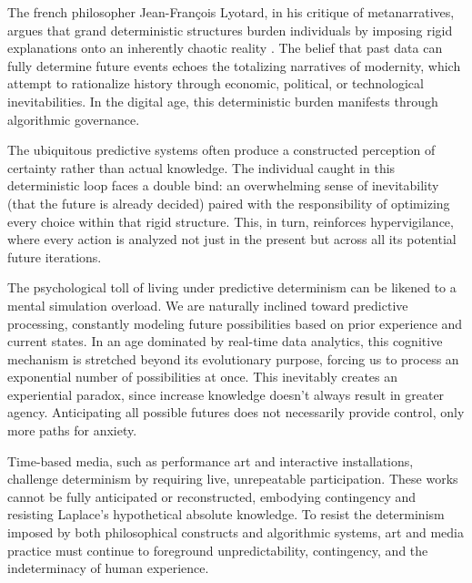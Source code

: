 The french philosopher Jean-François Lyotard, in his critique of metanarratives, argues that grand deterministic structures burden individuals by imposing rigid explanations onto an inherently chaotic reality \citep{lyotard1979}. The belief that past data can fully determine future events echoes the totalizing narratives of modernity, which attempt to rationalize history through economic, political, or technological inevitabilities. In the digital age, this deterministic burden manifests through algorithmic governance. 

The ubiquitous predictive systems often produce a constructed perception of certainty rather than actual knowledge. The individual caught in this deterministic loop faces a double bind: an overwhelming sense of inevitability (that the future is already decided) paired with the responsibility of optimizing every choice within that rigid structure. This, in turn, reinforces hypervigilance, where every action is analyzed not just in the present but across all its potential future iterations.

% 
The psychological toll of living under predictive determinism can be likened to a mental simulation overload.
We are naturally inclined toward predictive processing, constantly modeling future possibilities based on prior experience and current states. In an age dominated by real-time data analytics, this cognitive mechanism is stretched beyond its evolutionary purpose, forcing us to process an exponential number of possibilities at once. This inevitably creates an experiential paradox, since increase knowledge doesn't always result in greater agency. Anticipating all possible futures does not necessarily provide control, only more paths for anxiety.
% 

%
Time-based media, such as performance art and interactive installations, challenge determinism by requiring live, unrepeatable participation. These works cannot be fully anticipated or reconstructed, embodying contingency and resisting Laplace's hypothetical absolute knowledge. To resist the determinism imposed by both philosophical constructs and algorithmic systems, art and media practice must continue to foreground unpredictability, contingency, and the indeterminacy of human experience.


